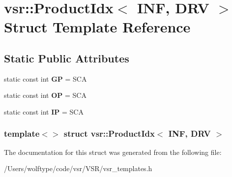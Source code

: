\hypertarget{structvsr_1_1_product_idx_3_01_i_n_f_00_01_d_r_v_01_4}{\section{vsr\-:\-:Product\-Idx$<$ I\-N\-F, D\-R\-V $>$ Struct Template Reference}
\label{structvsr_1_1_product_idx_3_01_i_n_f_00_01_d_r_v_01_4}
}
\subsection*{Static Public Attributes}
\begin{DoxyCompactItemize}
\item 
\hypertarget{structvsr_1_1_product_idx_3_01_i_n_f_00_01_d_r_v_01_4_a71d7eb43efb0b31b6118606bb526a381}{static const int {\bfseries G\-P} = S\-C\-A}\label{structvsr_1_1_product_idx_3_01_i_n_f_00_01_d_r_v_01_4_a71d7eb43efb0b31b6118606bb526a381}

\item 
\hypertarget{structvsr_1_1_product_idx_3_01_i_n_f_00_01_d_r_v_01_4_a82ae0a370824c0c7876fda626dd44cd9}{static const int {\bfseries O\-P} = S\-C\-A}\label{structvsr_1_1_product_idx_3_01_i_n_f_00_01_d_r_v_01_4_a82ae0a370824c0c7876fda626dd44cd9}

\item 
\hypertarget{structvsr_1_1_product_idx_3_01_i_n_f_00_01_d_r_v_01_4_a028a6d1640b0d5acfa43102e4f96b7b5}{static const int {\bfseries I\-P} = S\-C\-A}\label{structvsr_1_1_product_idx_3_01_i_n_f_00_01_d_r_v_01_4_a028a6d1640b0d5acfa43102e4f96b7b5}

\end{DoxyCompactItemize}
\subsubsection*{template$<$$>$ struct vsr\-::\-Product\-Idx$<$ I\-N\-F, D\-R\-V $>$}



The documentation for this struct was generated from the following file\-:\begin{DoxyCompactItemize}
\item 
/\-Users/wolftype/code/vsr/\-V\-S\-R/vsr\-\_\-templates.\-h\end{DoxyCompactItemize}
